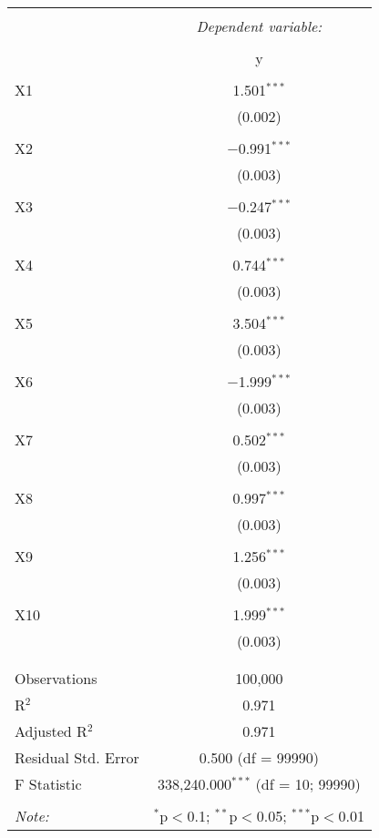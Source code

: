 \documentclass{article}
\begin{document}
\begin{table}[!htbp] \centering 
  \caption{} 
  \label{} 
\begin{tabular}{@{\extracolsep{5pt}}lc} 
\\[-1.8ex]\hline 
\hline \\[-1.8ex] 
 & \multicolumn{1}{c}{\textit{Dependent variable:}} \\ 
\cline{2-2} 
\\[-1.8ex] & y \\ 
\hline \\[-1.8ex] 
 X1 & 1.501$^{***}$ \\ 
  & (0.002) \\ 
  & \\ 
 X2 & $-$0.991$^{***}$ \\ 
  & (0.003) \\ 
  & \\ 
 X3 & $-$0.247$^{***}$ \\ 
  & (0.003) \\ 
  & \\ 
 X4 & 0.744$^{***}$ \\ 
  & (0.003) \\ 
  & \\ 
 X5 & 3.504$^{***}$ \\ 
  & (0.003) \\ 
  & \\ 
 X6 & $-$1.999$^{***}$ \\ 
  & (0.003) \\ 
  & \\ 
 X7 & 0.502$^{***}$ \\ 
  & (0.003) \\ 
  & \\ 
 X8 & 0.997$^{***}$ \\ 
  & (0.003) \\ 
  & \\ 
 X9 & 1.256$^{***}$ \\ 
  & (0.003) \\ 
  & \\ 
 X10 & 1.999$^{***}$ \\ 
  & (0.003) \\ 
  & \\ 
\hline \\[-1.8ex] 
Observations & 100,000 \\ 
R$^{2}$ & 0.971 \\ 
Adjusted R$^{2}$ & 0.971 \\ 
Residual Std. Error & 0.500 (df = 99990) \\ 
F Statistic & 338,240.000$^{***}$ (df = 10; 99990) \\ 
\hline 
\hline \\[-1.8ex] 
\textit{Note:}  & \multicolumn{1}{r}{$^{*}$p$<$0.1; $^{**}$p$<$0.05; $^{***}$p$<$0.01} \\ 
\end{tabular} 
\end{table}
\end{document}
